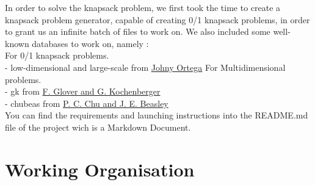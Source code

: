 \documentclass[a4paper, 11pt]{article}
\begin{document}
In order to solve the knapsack problem, we first took the time to create a knapsack problem generator, capable of creating 0/1 knapsack problems, in order to grant us an infinite batch of files to work on. We also included some well-known databases to work on, namely :\\
\tabto{1.5cm} For 0/1 knapsack problems.\\
\tabto{2.5cm} - low-dimensional and large-scale from \href{http://artemisa.unicauca.edu.co/~johnyortega/instances_01_KP/}{Johny Ortega}
\tabto{1.5cm} For Multidimensional problems.\\
\tabto{2.5cm} - gk from \href{https://www.researchgate.net/publication/271198281_Benchmark_instances_for_the_Multidimensional_Knapsack_Problem}{F. Glover and G. Kochenberger}\\
\tabto{2.5cm} - chubeas from \href{https://www.researchgate.net/publication/271198281_Benchmark_instances_for_the_Multidimensional_Knapsack_Problem}{P. C. Chu and J. E. Beasley}\\
You can find the requirements and launching instructions into the README.md file of the project wich is a Markdown Document.

\newpage

\section{Working Organisation}
\end{document}
